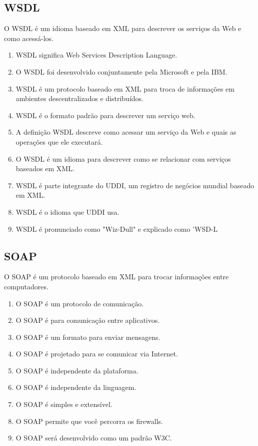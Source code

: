 \documentclass[12pt]{article}
\begin{document}
\subsection{WSDL}
O WSDL é um idioma baseado em XML para descrever os serviços da Web e como acessá-los.

\begin{enumerate}
\item WSDL significa Web Services Description Language.
\item O WSDL foi desenvolvido conjuntamente pela Microsoft e pela IBM.
\item WSDL é um protocolo baseado em XML para troca de informações em ambientes descentralizados e distribuídos.
\item WSDL é o formato padrão para descrever um serviço web.
\item A definição WSDL descreve como acessar um serviço da Web e quais as operações que ele executará.
\item O WSDL é um idioma para descrever como se relacionar com serviços baseados em XML.
\item WSDL é parte integrante do UDDI, um registro de negócios mundial baseado em XML.
\item WSDL é o idioma que UDDI usa.
\item WSDL é pronunciado como "Wiz-Dull" e explicado como 'WSD-L

\end{enumerate}
\subsection{SOAP}
O SOAP é um protocolo baseado em XML para trocar informações entre computadores.

\begin{enumerate}
	\item O SOAP é um protocolo de comunicação.
	\item O SOAP é para comunicação entre aplicativos.
	\item O SOAP é um formato para enviar mensagens.
	\item O SOAP é projetado para se comunicar via Internet.
	\item O SOAP é independente da plataforma.
	\item O SOAP é independente da linguagem.
	\item O SOAP é simples e extensível.
	\item O SOAP permite que você percorra os firewalls.
	\item O SOAP será desenvolvido como um padrão W3C.
\end{enumerate}
\end{document}

